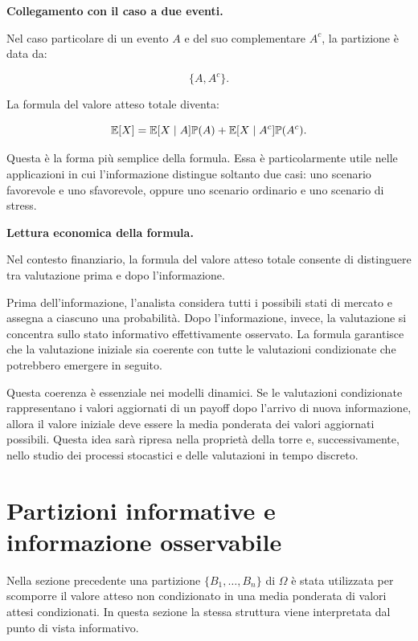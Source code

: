 \medskip

\noindent
\textbf{Collegamento con il caso a due eventi.}

Nel caso particolare di un evento $A$ e del suo complementare $A^c$, la partizione \`{e} data da:

\[
\{A,A^c\}.
\]

La formula del valore atteso totale diventa:

\[
\mathbb{E}[X]
=
\mathbb{E}[X\mid A]\mathbb{P}(A)
+
\mathbb{E}[X\mid A^c]\mathbb{P}(A^c).
\]

Questa \`{e} la forma pi\`{u} semplice della formula. Essa \`{e} particolarmente utile nelle applicazioni in cui l'informazione distingue soltanto due casi: uno scenario favorevole e uno sfavorevole, oppure uno scenario ordinario e uno scenario di stress.

\medskip

\noindent
\textbf{Lettura economica della formula.}

Nel contesto finanziario, la formula del valore atteso totale consente di distinguere tra valutazione prima e dopo l'informazione.

Prima dell'informazione, l'analista considera tutti i possibili stati di mercato e assegna a ciascuno una probabilit\`{a}. Dopo l'informazione, invece, la valutazione si concentra sullo stato informativo effettivamente osservato. La formula garantisce che la valutazione iniziale sia coerente con tutte le valutazioni condizionate che potrebbero emergere in seguito.

Questa coerenza \`{e} essenziale nei modelli dinamici. Se le valutazioni condizionate rappresentano i valori aggiornati di un payoff dopo l'arrivo di nuova informazione, allora il valore iniziale deve essere la media ponderata dei valori aggiornati possibili. Questa idea sar\`{a} ripresa nella propriet\`{a} della torre e, successivamente, nello studio dei processi stocastici e delle valutazioni in tempo discreto.

\section{Partizioni informative e informazione osservabile}

Nella sezione precedente una partizione $\{B_1,\ldots,B_n\}$ di $\Omega$ \`{e} stata utilizzata per scomporre il valore atteso non condizionato in una media ponderata di valori attesi condizionati. In questa sezione la stessa struttura viene interpretata dal punto di vista informativo.

